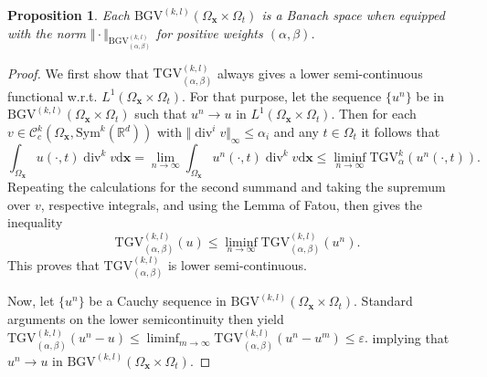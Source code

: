 \documentclass{article}
\DeclareMathOperator{\Div}{div}
\newcommand{\dx}{\mathrm{d}}
\newcommand{\R}{\mathbb{R}}
\newcommand{\TGV}{\mathrm{TGV}}
\newcommand{\BGV}{\mathrm{BGV}}
\newcommand{\OmegaSpace}{\Omega_\mathbf{x}}
\newcommand{\OmegaTime}{\Omega_t}
\newtheorem{proposition}[theorem]{Proposition}
\begin{document}
	\begin{proposition}
		Each $\BGV^{(k,l)}(\OmegaSpace \times\OmegaTime)$ is a Banach space when equipped with the norm $\Vert \cdot\Vert _{\BGV_{(\alpha, \beta)}^{(k,l)}}$ for positive weights $(\alpha, \beta)$.
	\end{proposition}
	\begin{proof}
		We first show that $\TGV_{(\alpha, \beta)}^{(k,l)}$ always gives a lower semi-continuous functional w.r.t. $L^1(\OmegaSpace\times \OmegaTime)$. For that purpose, let the sequence $\lbrace u^n\rbrace$ be in $\BGV^{(k,l)}(\OmegaSpace \times\OmegaTime)$ such that $u^n \rightarrow u$ in $L^1(\OmegaSpace\times \OmegaTime)$. Then for each $v \in \mathcal{C}_c^k(\OmegaSpace, \mathrm{Sym}^k(\R^d))$ with $\Vert \Div^i v\Vert _\infty\leq \alpha_i$ and any $t \in \OmegaTime$ it follows that
		\begin{equation*}
			\int_{\OmegaSpace}u(\cdot, t) \Div^k v \dx \mathbf{x} = \lim_{n\rightarrow\infty} \int_{\OmegaSpace}u^n(\cdot,t) \Div^k v \dx \mathbf{x}  \leq \liminf_{n\rightarrow \infty} \TGV_\alpha^k\left( u^n(\cdot, t) \right).
		\end{equation*}
		Repeating the calculations for the second summand and taking the supremum over $v$, respective integrals, and using the Lemma of Fatou, then gives the inequality
		\begin{equation*}
			\TGV_{(\alpha, \beta)}^{(k,l)}(u) \leq \liminf_{n\rightarrow\infty} \TGV_{(\alpha, \beta)}^{(k,l)}(u^n).
		\end{equation*}
		This proves that $\TGV_{(\alpha, \beta)}^{(k,l)}$ is lower semi-continuous.
		
		Now, let $\lbrace u^n \rbrace$ be a Cauchy sequence in $\BGV^{(k,l)}(\OmegaSpace \times\OmegaTime)$.
		Standard arguments on the lower semicontinuity then yield
		$
		\TGV_{(\alpha, \beta)}^{(k,l)}(u^n - u) \leq \liminf_{m \rightarrow \infty} \TGV_{(\alpha, \beta)}^{(k,l)}(u^n - u^m) \leq \varepsilon.
		$
		implying that $u^n \rightarrow u$ in $\BGV^{(k,l)}(\OmegaSpace \times\OmegaTime)$.
	\end{proof}
	
\end{document}
